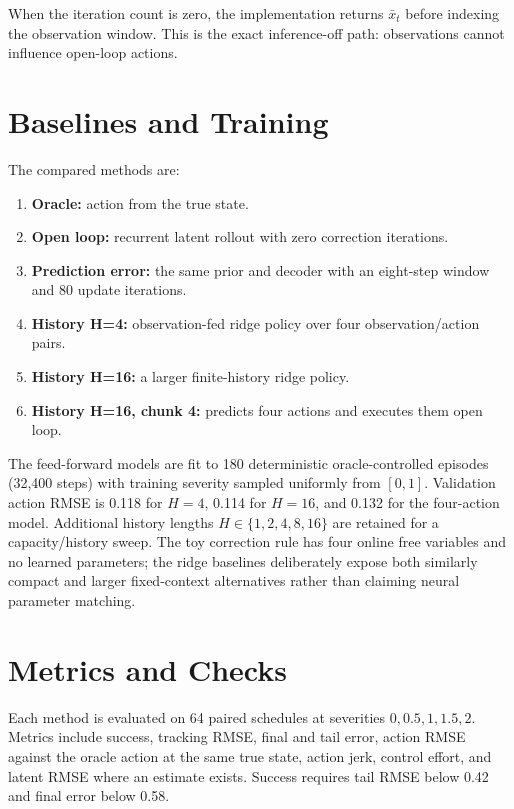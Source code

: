 \documentclass[11pt]{article}
\begin{document}
When the iteration count is zero, the implementation returns $\bar x_t$ before indexing the observation window. This is the exact inference-off path: observations cannot influence open-loop actions.

\section{Baselines and Training}

The compared methods are:
\begin{enumerate}[leftmargin=1.5em]
  \item \textbf{Oracle:} action from the true state.
  \item \textbf{Open loop:} recurrent latent rollout with zero correction iterations.
  \item \textbf{Prediction error:} the same prior and decoder with an eight-step window and 80 update iterations.
  \item \textbf{History H=4:} observation-fed ridge policy over four observation/action pairs.
  \item \textbf{History H=16:} a larger finite-history ridge policy.
  \item \textbf{History H=16, chunk 4:} predicts four actions and executes them open loop.
\end{enumerate}

The feed-forward models are fit to 180 deterministic oracle-controlled episodes (32,400 steps) with training severity sampled uniformly from $[0,1]$. Validation action RMSE is 0.118 for $H=4$, 0.114 for $H=16$, and 0.132 for the four-action model. Additional history lengths $H\in\{1,2,4,8,16\}$ are retained for a capacity/history sweep. The toy correction rule has four online free variables and no learned parameters; the ridge baselines deliberately expose both similarly compact and larger fixed-context alternatives rather than claiming neural parameter matching.

\section{Metrics and Checks}

Each method is evaluated on 64 paired schedules at severities $0,0.5,1,1.5,2$. Metrics include success, tracking RMSE, final and tail error, action RMSE against the oracle action at the same true state, action jerk, control effort, and latent RMSE where an estimate exists. Success requires tail RMSE below 0.42 and final error below 0.58.
\end{document}
